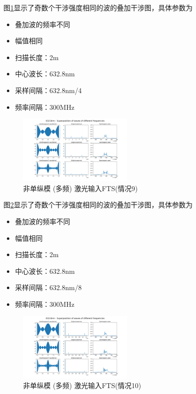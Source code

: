 \documentclass[conference]{IEEEtran}
\begin{document}
图\ref{pic18}显示了奇数个干涉强度相同的波的叠加干涉图，具体参数为
\begin{itemize}
    \item 叠加波的频率不同
    \item 幅值相同
    \item 扫描长度：2m
    \item 中心波长：632.8nm
    \item 采样间隔：632.8nm/4
    \item 频率间隔：300MHz
\end{itemize}
\begin{figure}[htbp]
    \centerline{\includegraphics[width=0.5\textwidth]{pic18.png}}
    \caption{非单纵模 (多频) 激光输入FTS(情况9)}
    \label{pic18}
\end{figure}

图\ref{pic19}显示了奇数个干涉强度相同的波的叠加干涉图，具体参数为
\begin{itemize}
    \item 叠加波的频率不同
    \item 幅值相同
    \item 扫描长度：2m
    \item 中心波长：632.8nm
    \item 采样间隔：632.8nm/8
    \item 频率间隔：300MHz
\end{itemize}
\begin{figure}[htbp]
    \centerline{\includegraphics[width=0.5\textwidth]{pic19.png}}
    \caption{非单纵模 (多频) 激光输入FTS(情况10)}
    \label{pic19}
\end{figure}
\end{document}

